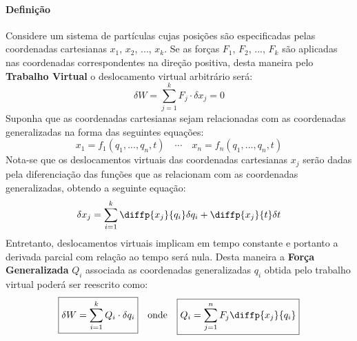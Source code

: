\documentclass{article}
\begin{document}
            \paragraph{Definição}Considere um sistema de partículas cujas posições são especificadas pelas coordenadas cartesianas $x_{1}$, $x_{2}$, ..., $x_{k}$. Se as forças $F_{1}$, $F_{2}$, ..., $F_{k}$ são aplicadas nas coordenadas correspondentes na direção positiva, desta maneira pelo \textbf{Trabalho Virtual} o deslocamento virtual arbitrário será:
                \begin{equation*}
                    \delta W = 
                    \sum_{j=1}^{k} F_{j} \cdot 
                    \delta x_{j} = 0
                \end{equation*}
            Suponha que as coordenadas cartesianas sejam relacionadas com as coordenadas generalizadas na forma das seguintes equações:
                \begin{equation*}
                    x_{1} = 
                    f_{1} (q_{1}, ..., q_{n}, t)
                    \quad
                    \cdots
                    \quad
                    x_{n} = 
                    f_{n} (q_{1}, ..., q_{n}, t)
                \end{equation*}
            Nota-se que os deslocamentos virtuais das coordenadas cartesianas $x_{j}$ serão dadas pela diferenciação das funções que as relacionam com as coordenadas generalizadas, obtendo a seguinte equação:
                \begin{equation*}
                    \delta x_{j} = 
                    \sum_{i=1}^{k} \diffp{x_{j}}{{q_{i}}}\delta q_{i} + 
                    \diffp{x_{j}}{t}\delta t
                \end{equation*}
            Entretanto, deslocamentos virtuais implicam em tempo constante e portanto a derivada parcial com relação ao tempo será nula. Desta maneira a \textbf{Força Generalizada} $Q_{i}$ associada as coordenadas generalizadas $q_{i}$ obtida pelo trabalho virtual poderá ser reescrito como:
                \begin{equation}
                    \boxed{
                        \delta W = 
                        \sum_{i=1}^{k} Q_{i} \cdot 
                        \delta q_{i}
                    }
                    \quad
                    \text{onde}
                    \quad
                    \boxed{
                        Q_{i} = 
                        \sum_{j=1}^{n} F_{j} \diffp{x_{j}}{{q_{i}}}
                    }
                \end{equation}
\end{document}
